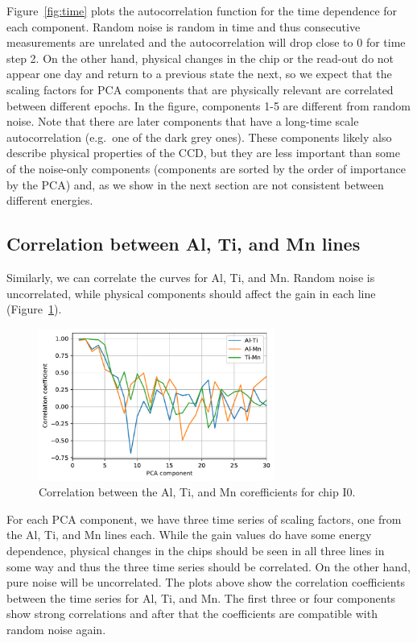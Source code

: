 \documentclass[]{spie}  %
\begin{document}
Figure~\ref{fig:time} plots the autocorrelation function for the time dependence for each component. Random noise is random in time and thus consecutive measurements are unrelated and the autocorrelation will drop close to 0 for time step 2. On the other hand, physical changes in the chip or the read-out do not appear one day and return to a previous state the next, so we expect that the scaling factors for PCA components that are physically relevant are correlated between different epochs.
In the figure, components 1-5 are different from random noise. Note that there are later components that have a long-time scale autocorrelation (e.g.\ one of the dark grey ones). These components likely also describe physical properties of the CCD, but they are less important than some of the noise-only components (components are sorted by the order of importance by the PCA) and, as we show in the next section are not consistent between different energies.

\subsection{Correlation between Al, Ti, and Mn lines}

Similarly, we can correlate the curves for Al, Ti, and Mn. Random noise is uncorrelated, while physical components should affect the gain in each line (Figure~\ref{fig:encorr}).

\begin{figure} [ht]
  \begin{center}
    \includegraphics[height=5cm]{figures/encorr.pdf}
  \end{center}
  \caption
      {Correlation between the Al, Ti, and Mn corefficients for chip I0.
        \label{fig:encorr}}
\end{figure}

For each PCA component, we have three time series of scaling factors, one from the Al, Ti, and Mn lines each. While the gain values do have some energy dependence, physical changes in the chips should be seen in all three lines in some way and thus the three time series should be correlated. On the other hand, pure noise will be uncorrelated. The plots above show the correlation coefficients between the time series for Al, Ti, and Mn. The first three or four components show strong correlations and after that the coefficients are compatible with random noise again.
\end{document}
